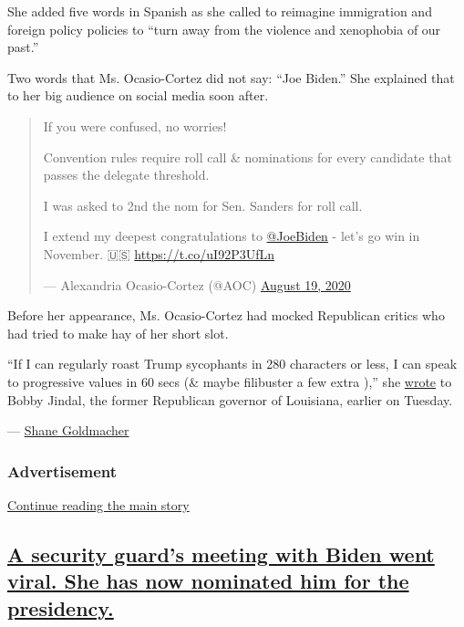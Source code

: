 She added five words in Spanish as she called to reimagine immigration
and foreign policy policies to ``turn away from the violence and
xenophobia of our past.''

Two words that Ms. Ocasio-Cortez did not say: ``Joe Biden.'' She
explained that to her big audience on social media soon after.

\begin{quote}
If you were confused, no worries!

Convention rules require roll call \& nominations for every candidate
that passes the delegate threshold.

I was asked to 2nd the nom for Sen. Sanders for roll call.

I extend my deepest congratulations to
\href{https://twitter.com/JoeBiden?ref_src=twsrc\%5Etfw}{@JoeBiden} -
let's go win in November. 🇺🇸 \url{https://t.co/uI92P3UfLn}

--- Alexandria Ocasio-Cortez (@AOC)
\href{https://twitter.com/AOC/status/1295902565750771717?ref_src=twsrc\%5Etfw}{August
19, 2020}
\end{quote}

Before her appearance, Ms. Ocasio-Cortez had mocked Republican critics
who had tried to make hay of her short slot.

``If I can regularly roast Trump sycophants in 280 characters or less, I
can speak to progressive values in 60 secs (\& maybe filibuster a few
extra ),'' she
\href{https://twitter.com/aoc/status/1295791805867360256}{wrote} to
Bobby Jindal, the former Republican governor of Louisiana, earlier on
Tuesday.

--- \href{https://www.nytimes3xbfgragh.onion/by/shane-goldmacher}{Shane
Goldmacher}

\hypertarget{advertisement-2}{%
\subsubsection{Advertisement}\label{advertisement-2}}

\protect\hyperlink{after-dfp-ad-mid3}{Continue reading the main story}

\hypertarget{a-security-guards-meeting-with-biden-went-viral-she-has-now-nominated-him-for-the-presidency}{%
\subsection{\texorpdfstring{\protect\hyperlink{a-security-guards-meeting-with-biden-went-viral-she-has-now-nominated-him-for-the-presidency}{A
security guard's meeting with Biden went viral. She has now nominated
him for the
presidency.}}{A security guard's meeting with Biden went viral. She has now nominated him for the presidency.}}\label{a-security-guards-meeting-with-biden-went-viral-she-has-now-nominated-him-for-the-presidency}}

